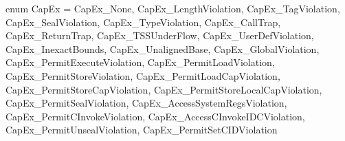 enum CapEx = {
  CapEx_None,
  CapEx_LengthViolation,
  CapEx_TagViolation,
  CapEx_SealViolation,
  CapEx_TypeViolation,
  CapEx_CallTrap,
  CapEx_ReturnTrap,
  CapEx_TSSUnderFlow,
  CapEx_UserDefViolation,
  CapEx_InexactBounds,
  CapEx_UnalignedBase,
  CapEx_GlobalViolation,
  CapEx_PermitExecuteViolation,
  CapEx_PermitLoadViolation,
  CapEx_PermitStoreViolation,
  CapEx_PermitLoadCapViolation,
  CapEx_PermitStoreCapViolation,
  CapEx_PermitStoreLocalCapViolation,
  CapEx_PermitSealViolation,
  CapEx_AccessSystemRegsViolation,
  CapEx_PermitCInvokeViolation,
  CapEx_AccessCInvokeIDCViolation,
  CapEx_PermitUnsealViolation,
  CapEx_PermitSetCIDViolation
}
